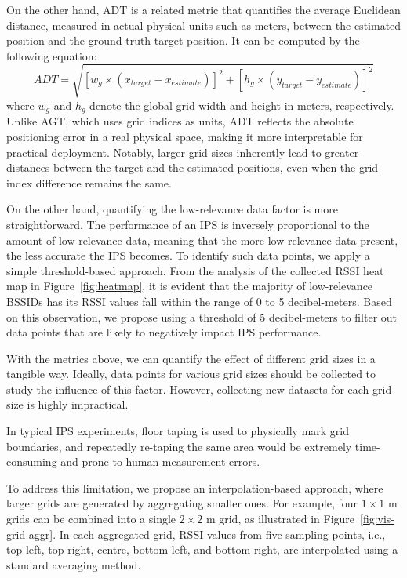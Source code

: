 \documentclass[runningheads]{llncs}
\begin{document}
On the other hand, ADT is a related metric that quantifies the average Euclidean distance, measured in actual physical units such as meters, between the estimated position and the ground-truth target position. It can be computed by the following equation:
\begin{equation}
        ADT = \sqrt{[w_{g} \times (x_{target} - x_{estimate})]^2 + [h_{g} \times (y_{target} - y_{estimate})]^2}
\end{equation}
where $w_{g}$ and $h_{g}$ denote the global grid width and height in meters, respectively. Unlike AGT, which uses grid indices as units, ADT reflects the absolute positioning error in a real physical space, making it more interpretable for practical deployment. Notably, larger grid sizes inherently lead to greater distances between the target and the estimated positions, even when the grid index difference remains the same.

On the other hand, quantifying the low-relevance data factor is more straightforward. The performance of an IPS is inversely proportional to the amount of low-relevance data, meaning that the more low-relevance data present, the less accurate the IPS becomes. To identify such data points, we apply a simple threshold-based approach. From the analysis of the collected RSSI heat map in Figure~\ref{fig:heatmap}, it is evident that the majority of low-relevance BSSIDs has its RSSI values fall within the range of 0 to 5 decibel-meters. Based on this observation, we propose using a threshold of 5 decibel-meters to filter out data points that are likely to negatively impact IPS performance.

With the metrics above, we can quantify the effect of different grid sizes in a tangible way. Ideally, data points for various grid sizes should be collected to study the influence of this factor. However, collecting new datasets for each grid size is highly impractical.

 In typical IPS experiments, floor taping is used to physically mark grid boundaries, and repeatedly re-taping the same area would be extremely time-consuming and prone to human measurement errors.
 
  To address this limitation, we propose an interpolation-based approach, where larger grids are generated by aggregating smaller ones. For example, four $1 \times 1$ m grids can be combined into a single $2 \times 2$ m grid, as illustrated in Figure~\ref{fig:vis-grid-aggr}. In each aggregated grid, RSSI values from five sampling points, i.e., top-left, top-right, centre, bottom-left, and bottom-right, are interpolated using a standard averaging method.
\end{document}

